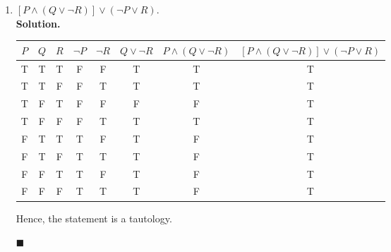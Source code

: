 \documentclass{report}
\newcommand{\sol}{\vspace{1em}\\\textbf{Solution.}\vspace{0.5em}}
\newcommand{\qed}{\ \\\strut\hfill$\blacksquare$\vspace{1em}}
\begin{document}
\begin{enumerate}[leftmargin=*]
\begin{enumerate}
              \item $[P \wedge(Q \vee \neg R)] \vee(\neg P \vee R)$.
                    \sol{}
                    \begin{center}
                        \begin{tabular}{cccccccc}
                            $P$ & $Q$ & $R$ & $\neg P$ & $\neg R$ & $Q \vee \neg R$ & $P \wedge(Q \vee \neg R)$ & $[P \wedge(Q \vee \neg R)] \vee(\neg P \vee R)$ \\
                            \hline
                            T   & T   & T   & F        & F        & T               & T                         & T                                               \\
                            T   & T   & F   & F        & T        & T               & T                         & T                                               \\
                            T   & F   & T   & F        & F        & F               & F                         & T                                               \\
                            T   & F   & F   & F        & T        & T               & T                         & T                                               \\
                            F   & T   & T   & T        & F        & T               & F                         & T                                               \\
                            F   & T   & F   & T        & T        & T               & F                         & T                                               \\
                            F   & F   & T   & T        & F        & T               & F                         & T                                               \\
                            F   & F   & F   & T        & T        & T               & F                         & T
                        \end{tabular}
                    \end{center}
                    Hence, the statement is a tautology.\qed
          \end{enumerate}


\end{enumerate}
\end{document}
